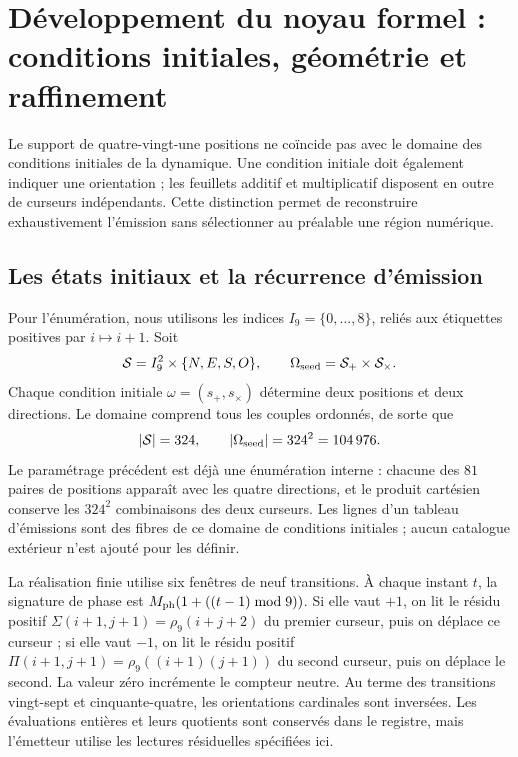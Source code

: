 \section{Développement du noyau formel : conditions initiales, géométrie et raffinement}
\label{sec:extension}

Le support de quatre-vingt-une positions ne coïncide pas avec le domaine des conditions initiales de la dynamique. Une condition initiale doit également indiquer une orientation ; les feuillets additif et multiplicatif disposent en outre de curseurs indépendants. Cette distinction permet de reconstruire exhaustivement l’émission sans sélectionner au préalable une région numérique.

\subsection{Les états initiaux et la récurrence d’émission}

Pour l’énumération, nous utilisons les indices \(I_9=\{0,\ldots,8\}\), reliés aux étiquettes positives par \(i\mapsto i+1\). Soit
\[
 \mathcal S=I_9^2\times\{N,E,S,O\},\qquad
 \Omega_{\rm seed}=\mathcal S_+\times\mathcal S_\times.
\]
Chaque condition initiale \(\omega=(s_+,s_\times)\) détermine deux positions et deux directions. Le domaine comprend tous les couples ordonnés, de sorte que
\begin{equation}
 |\mathcal S|=324,\qquad |\Omega_{\rm seed}|=324^2=104\,976.
 \label{eq:semillas}
\end{equation}
Le paramétrage précédent est déjà une énumération interne : chacune des
\(81\) paires de positions apparaît avec les quatre directions, et le produit
cartésien conserve les \(324^2\) combinaisons des deux curseurs. Les lignes
d’un tableau d’émissions sont des fibres de ce domaine de conditions initiales ;
aucun catalogue extérieur n’est ajouté pour les définir.

La réalisation finie utilise six fenêtres de neuf transitions. À chaque instant \(t\), la signature de phase est \(M_{\rm ph}(1+((t-1)\bmod9))\). Si elle vaut \(+1\), on lit le résidu positif \(\Sigma(i+1,j+1)=\rho_9(i+j+2)\) du premier curseur, puis on déplace ce curseur ; si elle vaut \(-1\), on lit le résidu positif \(\Pi(i+1,j+1)=\rho_9((i+1)(j+1))\) du second curseur, puis on déplace le second. La valeur zéro incrémente le compteur neutre. Au terme des transitions vingt-sept et cinquante-quatre, les orientations cardinales sont inversées. Les évaluations entières et leurs quotients sont conservés dans le registre, mais l’émetteur utilise les lectures résiduelles spécifiées ici.

